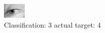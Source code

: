 \begin{figure}[h!]
\begin{center}
\includegraphics[width=0.60\columnwidth]{figures/ID2955_class_3_target_4.png}
\end{center}
\caption{ Classification: 3 actual target: 4}
\label{fig:ID2955_class_3_target_4}
\end{figure}
